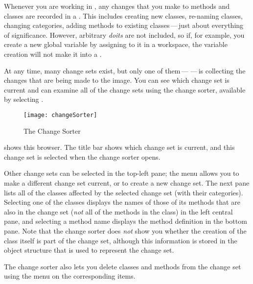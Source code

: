 \documentclass[a4paper,10pt,twoside]{book}
\begin{document}
Whenever you are working in \pharo, any changes that you make to methods and classes are recorded in a .
This includes creating new classes, re-naming classes, changing categories, adding methods to existing classes\,---\,just about everything of significance.  
However, arbitrary \emph{doits} are not included, so if, for example, you create a new global variable by assigning to it in a workspace, the variable creation will not make it into a .

At any time, many change sets exist, but only one of them\,---\,\,---\,is collecting the changes that are being made to the image.  
You can see which change set is current and can examine all of the change sets using the  change sorter, available by selecting .

\begin{figure}[btp]
	\begin{center}
		\texttt{[image: changeSorter]}
	\end{center}
	\caption{The Change Sorter}
\end{figure}

 shows this browser.  The title bar shows which change set is current, and this change set is selected when the change sorter opens. 

Other change sets can be selected in the top-left pane; the \actclick menu allows you to make a different change set current, or to create a new change set.
The next pane lists all of the classes affected by the selected change set (with their categories).
Selecting one of the classes displays the names of those of its methods that are also in the change set (\emph{not} all of the methods in the class) in the left central pane, and selecting a method name displays the method definition in the bottom pane.
Note that the change sorter does \emph{not} show you whether the creation of the class itself is part of the change set, although this information is stored in the object structure that is used to represent the change set.

The change sorter also lets you delete classes and methods from the change set using the \actclick menu on the corresponding items.
\end{document}

